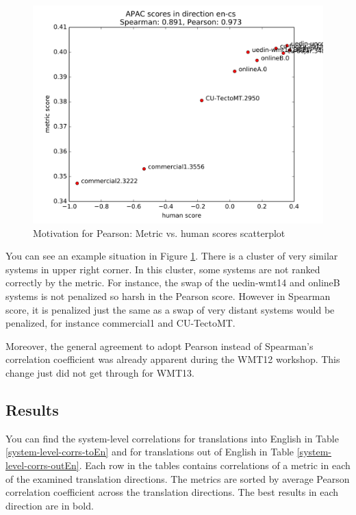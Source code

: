 \begin{figure}
    \begin{center}
        \includegraphics[width=\textwidth]{img/pearson-motivation.pdf}
    \end{center}

    \caption[Motivation for Pearson: Metric vs. human scores scatterplot]{
      Motivation for Pearson: Metric vs. human scores scatterplot
}

    \label{tree-align}
\end{figure}

You can see an example situation in Figure \ref{tree-align}. There is a cluster
of very similar systems in upper right corner. In this cluster, some systems
are not ranked correctly by the metric. For instance, the swap of the uedin-wmt14
and onlineB systems is not penalized so harsh in the Pearson score. However
in Spearman score, it is penalized just the same as a swap of very distant
systems would be penalized, for instance commercial1 and CU-TectoMT.


Moreover, the general agreement to adopt Pearson instead of Spearman's
correlation coefficient was already apparent during the WMT12 workshop. This
change just did not get through for WMT13.

\subsection{Results}

You can find the system-level correlations for translations into English in
Table \ref{system-level-corrs-toEn} and for translations out of English in
Table \ref{system-level-corrs-outEn}. Each row in the tables contains
correlations of a metric in each of the examined translation directions. The
metrics are sorted by average Pearson correlation coefficient across the
translation directions. The best results in each direction are in bold.

